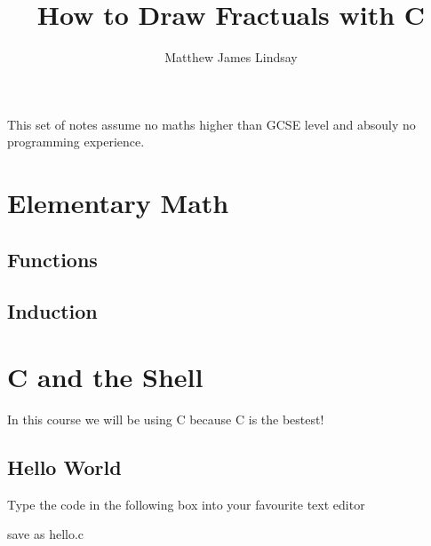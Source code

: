 \documentclass[12pt]{article}
\begin{document}
\begin{titlepage}
    {\centering
        \title{{How to Draw Fractuals with C}\\}
        \author{Matthew James Lindsay}
        \date{}
        }
    \maketitle
\end{titlepage}

\tableofcontents
\clearpage

\setcounter{page}{1}
    This set of notes assume no maths higher than GCSE level and absouly no programming experience. 

\section{Elementary Math}
\subsection{Functions}
\subsection{Induction}

\section{C and the Shell}
    In this course we will be using C because C is the bestest!
\subsection{Hello World}
    Type the code in the following box into your favourite text editor
    
    save as hello.c
    
\end{document}
